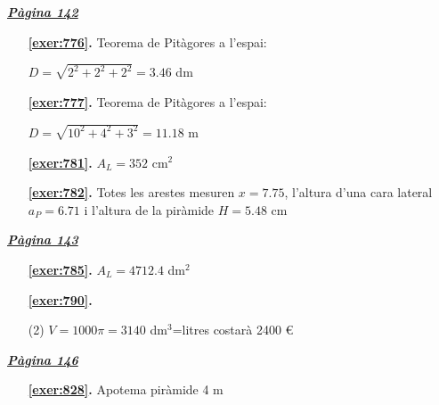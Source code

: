 \hyperlink{page.142}{\textbf{\em Pàgina 142}}
\begin{enumerate}
\item[\fontfamily{phv}\selectfont\color{blue}\textbf{\ref{exer:776}. }] \label{ans:776} 
Teorema de Pitàgores a l'espai:\par $D=\sqrt {2^2+2^2+2^2}=3.46$ dm
 \end{enumerate}
\begin{enumerate}
\item[\fontfamily{phv}\selectfont\color{blue}\textbf{\ref{exer:777}. }] \label{ans:777} 
Teorema de Pitàgores a l'espai:\par $D=\sqrt {10^2+4^2+3^2}=11.18$ m
\item[\fontfamily{phv}\selectfont\color{blue}\textbf{\ref{exer:781}. }] \label{ans:781} 
$A_L=352$ cm$^2$
\item[\fontfamily{phv}\selectfont\color{blue}\textbf{\ref{exer:782}. }] \label{ans:782} 
Totes les arestes mesuren $x=7.75$, l'altura d'una cara lateral $a_P=6.71$ i l'altura de la piràmide $H=5.48$ cm
 \end{enumerate}
\vspace{0.3cm}


\hyperlink{page.143}{\textbf{\em Pàgina 143}}
\begin{enumerate}
\item[\fontfamily{phv}\selectfont\color{blue}\textbf{\ref{exer:785}. }] \label{ans:785} 
$A_L=4712.4$ dm$^2$
 \end{enumerate}
\begin{enumerate}



 \item[\fontfamily{phv}\selectfont\color{blue}\textbf{\ref{exer:790}. }] \label{ans:790}
 \begin{tasks}[column-sep=1em, item-indent=1.3333em](2)
	 \task* $V=1000\pi =3140$ dm$^3$=litres
	 \task costarà 2400 \euro {}
\end{tasks}
 \end{enumerate}
\vspace{0.3cm}


\hyperlink{page.146}{\textbf{\em Pàgina 146}}
\begin{enumerate}
\item[\fontfamily{phv}\selectfont\color{blue}\textbf{\ref{exer:828}. }] \label{ans:828} 
Apotema piràmide 4 m
 \end{enumerate}
\vspace{0.3cm}

